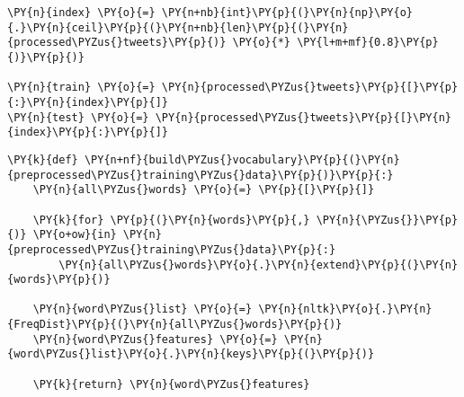     \begin{tcolorbox}[breakable, size=fbox, boxrule=1pt, pad at break*=1mm,colback=cellbackground, colframe=cellborder]
\begin{Verbatim}[commandchars=\\\{\}]
\PY{n}{index} \PY{o}{=} \PY{n+nb}{int}\PY{p}{(}\PY{n}{np}\PY{o}{.}\PY{n}{ceil}\PY{p}{(}\PY{n+nb}{len}\PY{p}{(}\PY{n}{processed\PYZus{}tweets}\PY{p}{)} \PY{o}{*} \PY{l+m+mf}{0.8}\PY{p}{)}\PY{p}{)}

\PY{n}{train} \PY{o}{=} \PY{n}{processed\PYZus{}tweets}\PY{p}{[}\PY{p}{:}\PY{n}{index}\PY{p}{]}
\PY{n}{test} \PY{o}{=} \PY{n}{processed\PYZus{}tweets}\PY{p}{[}\PY{n}{index}\PY{p}{:}\PY{p}{]}
\end{Verbatim}
\end{tcolorbox}

    \begin{tcolorbox}[breakable, size=fbox, boxrule=1pt, pad at break*=1mm,colback=cellbackground, colframe=cellborder]
\begin{Verbatim}[commandchars=\\\{\}]
\PY{k}{def} \PY{n+nf}{build\PYZus{}vocabulary}\PY{p}{(}\PY{n}{preprocessed\PYZus{}training\PYZus{}data}\PY{p}{)}\PY{p}{:}
    \PY{n}{all\PYZus{}words} \PY{o}{=} \PY{p}{[}\PY{p}{]}

    \PY{k}{for} \PY{p}{(}\PY{n}{words}\PY{p}{,} \PY{n}{\PYZus{}}\PY{p}{)} \PY{o+ow}{in} \PY{n}{preprocessed\PYZus{}training\PYZus{}data}\PY{p}{:}
        \PY{n}{all\PYZus{}words}\PY{o}{.}\PY{n}{extend}\PY{p}{(}\PY{n}{words}\PY{p}{)}

    \PY{n}{word\PYZus{}list} \PY{o}{=} \PY{n}{nltk}\PY{o}{.}\PY{n}{FreqDist}\PY{p}{(}\PY{n}{all\PYZus{}words}\PY{p}{)}
    \PY{n}{word\PYZus{}features} \PY{o}{=} \PY{n}{word\PYZus{}list}\PY{o}{.}\PY{n}{keys}\PY{p}{(}\PY{p}{)}

    \PY{k}{return} \PY{n}{word\PYZus{}features}
\end{Verbatim}
\end{tcolorbox}

